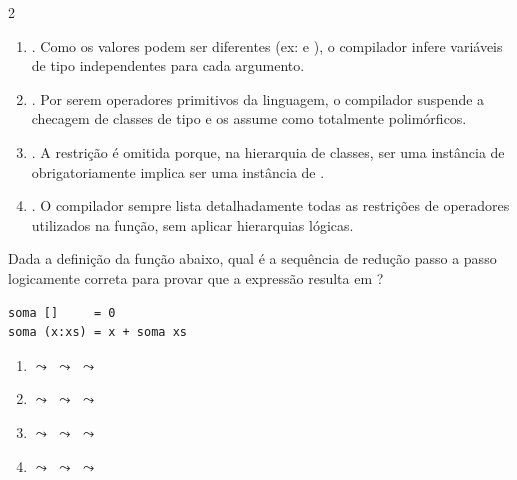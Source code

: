 \documentclass[a4paper,10pt,brazil]{article}
\begin{document}
\begin{multicols}{2}
\begin{enumerate}
  \item {}. Como os valores podem ser diferentes (ex:  e ), o compilador infere variáveis de tipo independentes para cada argumento.

  \item {}. Por serem operadores primitivos da linguagem, o compilador suspende a checagem de classes de tipo e os assume como totalmente polimórficos.

  \item {}. A restrição  é omitida porque, na hierarquia de classes, ser uma instância de  obrigatoriamente implica ser uma instância de .

  \item {}. O compilador sempre lista detalhadamente todas as restrições de operadores utilizados na função, sem aplicar hierarquias lógicas.


\end{enumerate}

Dada a definição da função  abaixo, qual é a sequência de redução passo a passo logicamente correta para provar que a expressão  resulta em ?

\begin{verbatim}
soma []     = 0
soma (x:xs) = x + soma xs
\end{verbatim}

\begin{enumerate}
  \item {} $\leadsto$  $\leadsto$  $\leadsto$ 

  \item {} $\leadsto$  $\leadsto$  $\leadsto$ 

  \item {} $\leadsto$  $\leadsto$  $\leadsto$ 

  \item {} $\leadsto$  $\leadsto$  $\leadsto$ 


\end{enumerate}
\end{multicols}
\end{document}
